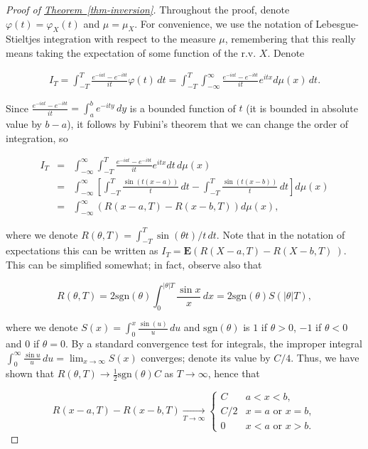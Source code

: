 \documentclass[11pt]{report}
\theoremstyle{plain}
\theoremstyle{definition}
\begin{document}
\begin{proof}[Proof of \texorpdfstring{\hyperref[thm-inversion]{Theorem~\ref*{thm-inversion}}}{Theorem}]
Throughout the proof, denote $\varphi(t)=\varphi_X(t)$
and $\mu=\mu_X$. For convenience, we use the notation
of Lebesgue-Stieltjes integration with respect to the
measure $\mu$, remembering that this really means
taking the expectation of some function of the r.v.
$X$. Denote

\begin{align*}
\tag{12}\label{eq:inversionproof}
I_T = \int_{-T}^T \frac{e^{-i a t}-e^{-i b t}}{it} \varphi(t)\,dt
= \int_{-T}^T \int_{-\infty}^\infty \frac{e^{-i a t}-e^{-i b t}}{it} e^{itx}d\mu(x)\,dt.
\end{align*}

\noindent Since
$\frac{e^{-i a t}-e^{-i b t}}{it} = \int_a^b e^{-i t
y}\,dy$
is a bounded function of $t$ (it is bounded in
absolute value by $b-a$), it follows by Fubini's
theorem that we can change the order of integration,
so

\begin{eqnarray*}
I_T&=& \int_{-\infty}^\infty \int_{-T}^T \frac{e^{-i a t}-e^{-i b t}}{it} e^{itx} dt\,d\mu(x) \\
&=&
\int_{-\infty}^\infty \left[ \int_{-T}^T \frac{\sin(t(x-a))}{t}\,dt-\int_{-T}^T \frac{\sin(t(x-b))}{t}\,dt \right]d\mu(x) \\
&=& \int_{-\infty}^\infty \left( R(x-a,T)-R(x-b,T) \right) d\mu(x),
\end{eqnarray*}

\noindent where we denote
$R(\theta, T) = \int_{-T}^T \sin(\theta t)/t\,dt$.
Note that in the notation of expectations this can be
written as
$I_T = \mathbf{E}\left( R(X-a,T)-R(X-b,T)\ \right)$.
This can be simplified somewhat; in fact, observe also
that

\[
R(\theta,T)= 2\textrm{sgn}(\theta) \int_0^{|\theta|T} \frac{\sin x}{x}\,dx = 2 \textrm{sgn}(\theta) S(|\theta| T),
\]

\noindent where we denote
$S(x) = \int_0^x \frac{\sin(u)}{u}\,du$ and
$\textrm{sgn}(\theta)$ is $1$ if $\theta>0$, $-1$ if
$\theta<0$ and $0$ if $\theta=0$. By a standard
convergence test for integrals, the improper integral
$\int_0^\infty \frac{\sin u}{u}\,du =
\lim_{x\to\infty}S(x)$
converges; denote its value by $C/4$. Thus, we have
shown that
$R(\theta,T)\to \frac12\textrm{sgn}(\theta) C$ as
$T\to \infty$, hence that

\[
R(x-a,T)-R(x-b,T) \xrightarrow[T\to\infty]{} \begin{cases}
C & a<x<b, \\
C/2 & x=a\textrm{ or }x=b, \\
0 & x<a\textrm{ or }x>b.
\end{cases}
\]


\end{proof}
\end{document}

